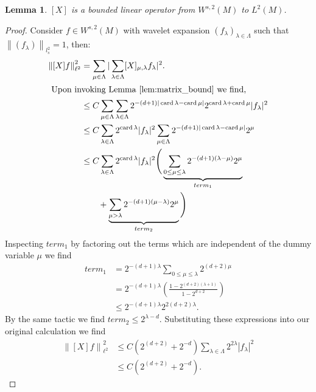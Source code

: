 \documentclass[12pt]{amsart}
\newcommand{\norm}[1]{\ensuremath{\left\| #1 \right\| }}
\newcommand{\abs}[1]{\ensuremath{ | #1 | }}
\newtheorem{lem}[thm]{Lemma}
\DeclareMathOperator{\card}{card}
\begin{document}
\begin{lem} \label{lem:M_bound}
	$[X]$ is a bounded linear operator from $W^{s,2}(M)$ to $L^2(M)$.
\end{lem}
\begin{proof}
	Consider $f \in W^{s,2}(M)$ with wavelet expansion $(f_\lambda)_{\lambda \in \Lambda}$ such that $\norm{(f_\lambda)}_{l_s^2} = 1$, then:
	\begin{align*}
		\norm{[X] f}_{\ell^2}^2   &=    \sum_{\mu \in \Lambda} \abs{ \sum_{\lambda \in \Lambda} [X]_{\mu,\lambda} f_{\lambda} }^2. \\
		\intertext{ Upon invoking Lemma \ref{lem:matrix_bound} we find,}
							&\leq C\sum_{\mu \in \Lambda} \sum_{\lambda \in \Lambda} 2^{-(d+1)\abs{\card{\lambda} - \card{\mu}}} 2^{\card{\lambda}+\card{\mu}} \abs{f_\lambda}^2 \\
							&\leq C\sum_{\lambda \in \Lambda} 2^{\card{\lambda}} \abs{f_\lambda}^2 \sum_{\mu \in \Lambda} 2^{-(d+1)\abs{\card{\lambda}-\card{\mu}}}2^\mu \\
							&\leq C\sum_{\lambda \in \Lambda}  2^{\card{\lambda}} \abs{f_\lambda}^2 \Bigg( \underbrace{\sum_{0\leq\mu\leq\lambda} 2^{-(d+1)(\lambda - \mu)}2^{\mu}}_{term_1} \\
							&\qquad  + \underbrace{\sum_{\mu > \lambda} 2^{-(d+1)(\mu-\lambda)}2^{\mu} }_{term_2} \Bigg) \label{eq:terms}
		\end{align*}
		Inspecting $term_1$ by factoring out the terms which are independent of the dummy variable $\mu$ we find
		\begin{align*}
			term_1 &= 2^{-(d+1) \lambda }\sum_{0\leq\mu\leq\lambda} 2^{(d+2) \mu} \\
			&= 2^{-(d+1) \lambda} \left(  \frac{ 1-2^{(d+2)(\lambda + 1)} }{1 - 2^{d+2} } \right) \\
			&\leq 2^{-(d+1) \lambda} 2^{2(d+2)\lambda}.
		\end{align*}
		By the same tactic we find $term_2 \leq 2^{\lambda - d}$.  Substituting these expressions into our original calculation we find
		\begin{align*}	
			\norm{[X]f}_{\ell^2}^2 	&\leq C(2^{(d+2)}+2^{-d}) \sum_{\lambda \in \Lambda} 2^{2\lambda} \abs{f_{\lambda}}^2 \\
							&\leq C(2^{(d+2)}+2^{-d}).
		\end{align*}
\end{proof}
\end{document}

